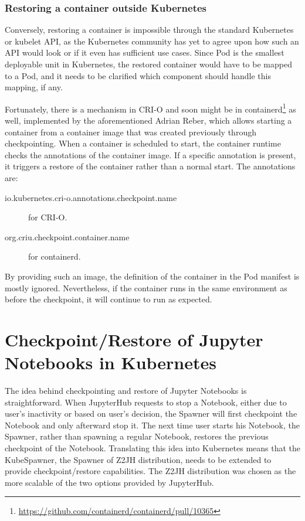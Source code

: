 \documentclass[
  digital,     %
  oneside,     %
  nosansbold,  %
  nocolorbold, %
  lof,         %
  lot,         %
]{fithesis4}
\begin{document}
\subsection{Restoring a container outside Kubernetes}
\label{subsec:restoring}
Conversely, restoring a container is impossible through the standard Kubernetes or kubelet API, as the Kubernetes community has yet to agree upon how such an API would look or if it even has sufficient use cases. Since Pod is the smallest deployable unit in Kubernetes, the restored container would have to be mapped to a Pod, and it needs to be clarified which component should handle this mapping, if any.

Fortunately, there is a mechanism in CRI-O and soon might be in containerd\footnote{\url{https://github.com/containerd/containerd/pull/10365}} as well, implemented by the aforementioned Adrian Reber, which allows starting a container from a container image that was created previously through checkpointing. When a container is scheduled to start, the container runtime checks the annotations of the container image. If a specific annotation is present, it triggers a restore of the container rather than a normal start. The annotations are:
\begin{description}
    \item[io.kubernetes.cri-o.annotations.checkpoint.name] for CRI-O.
    \item[org.criu.checkpoint.container.name] for containerd.
\end{description}

By providing such an image, the definition of the container in the Pod manifest is mostly ignored. Nevertheless, if the container runs in the same environment as before the checkpoint, it will continue to run as expected.


\chapter{Checkpoint/Restore of Jupyter Notebooks in Kubernetes}
The idea behind checkpointing and restore of Jupyter Notebooks is straightforward. When JupyterHub requests to stop a Notebook, either due to user's inactivity or based on user's decision, the Spawner will first checkpoint the Notebook and only afterward stop it. The next time user starts his Notebook, the Spawner, rather than spawning a regular Notebook, restores the previous checkpoint of the Notebook. Translating this idea into Kubernetes means that the KubeSpawner, the Spawner of Z2JH distribution, needs to be extended to provide checkpoint/restore capabilities. The Z2JH distribution was chosen as the more scalable of the two options provided by JupyterHub.
\end{document}
